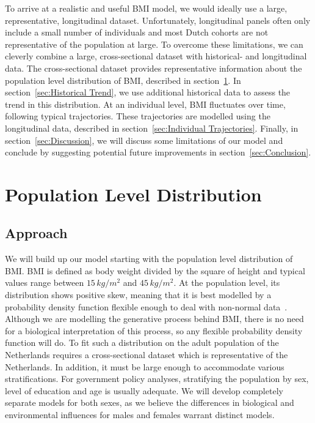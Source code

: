 \documentclass{imammb}
\numberwithin{equation}{section}
\begin{document}
To arrive at a realistic and useful BMI model, we would ideally use a large, representative, longitudinal dataset. Unfortunately, longitudinal panels often only include a small number of individuals and most Dutch cohorts are not representative of the population at large. To overcome these limitations, we can cleverly combine a large, cross-sectional dataset with historical- and longitudinal data. The cross-sectional dataset provides representative information about the population level distribution of BMI, described in section~\ref{sec:Population Level Distribution}. In section~\ref{sec:Historical Trend}, we use additional historical data to assess the trend in this distribution. At an individual level, BMI fluctuates over time, following typical trajectories. These trajectories are modelled using the longitudinal data, described in section~\ref{sec:Individual Trajectories}. Finally, in section~\ref{sec:Discussion}, we will discuss some limitations of our model and conclude by suggesting potential future improvements in section~\ref{sec:Conclusion}.

\section{Population Level Distribution}
\label{sec:Population Level Distribution}

\subsection{Approach}
\label{sec:Population Level Distribution/Approach}

We will build up our model starting with the population level distribution of BMI. BMI is defined as body weight divided by the square of height and typical values range between $15 \, kg / m^2$ and $45 \, kg / m^2$. At the population level, its distribution shows positive skew, meaning that it is best modelled by a probability density function flexible enough to deal with non-normal data~\citep{Majer2013}. Although we are modelling the generative process behind BMI, there is no need for a biological interpretation of this process, so any flexible probability density function will do. To fit such a distribution on the adult population of the Netherlands requires a cross-sectional dataset which is representative of the Netherlands. In addition, it must be large enough to accommodate various stratifications. For government policy analyses, stratifying the population by sex, level of education and age is usually adequate. We will develop completely separate models for both sexes, as we believe the differences in biological and environmental influences for males and females warrant distinct models.
\end{document}

